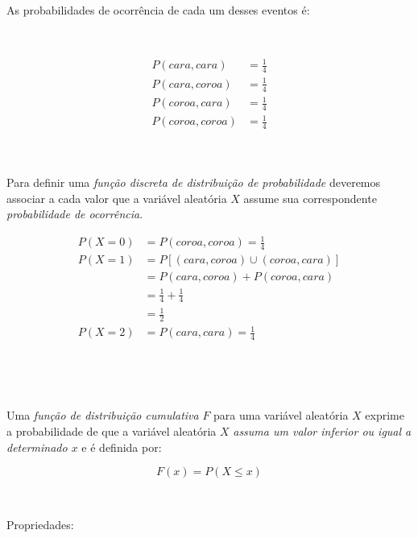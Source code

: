 \documentclass[
]{book}
\begin{document}
~

As probabilidades de ocorrência de cada um desses eventos é:

~

\begin{align*}
P(cara,cara) & = \frac{1}{4} \\
P(cara,coroa) & = \frac{1}{4}\\  
P(coroa,cara) & = \frac{1}{4} \\
P(coroa,coroa) & = \frac{1}{4}\\
\end{align*}

~

Para definir uma \emph{função discreta de distribuição de probabilidade} deveremos associar a cada valor que a variável aleatória \(X\) assume sua correspondente \emph{probabilidade de ocorrência}.

\begin{align*}
P(X=0) & = P(coroa,coroa) = \frac{1}{4} \\  
P(X=1) & = P[(cara,coroa) \cup (coroa,cara)] \\
       & = P(cara,coroa) + P(coroa,cara)\\
       & = \frac{1}{4} + \frac{1}{4} \\
       & = \frac{1}{2} \\
P(X=2) & = P(cara,cara) = \frac{1}{4}
\end{align*}

~

\begin{table}[]
\caption*{Função discreta de probabilidades da variável aleatória X}
\end{table}

~

Uma \emph{função de distribuição cumulativa} \(F\) para uma variável aleatória \(X\) exprime a probabilidade de que a variável aleatória \(X\) \emph{assuma um valor inferior ou igual a determinado \(x\)} e é definida por:

\hfill\break

\[
F(x) = P(X \leq x)
\]

~

Propriedades:
\end{document}
